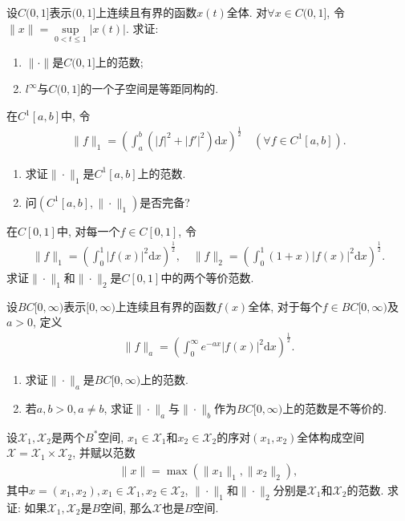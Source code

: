 \documentclass[../../main.tex]{subfiles}%
\begin{document}
\begin{example}
设$C(0, 1]$表示$(0, 1]$上连续且有界的函数$x(t)$全体. 对$\forall x \in C(0, 1]$, 令$\|x\| = \sup\limits_{0 < t \leqslant 1} |x(t)|$. 求证:
\begin{enumerate}[(1)]
\item $\|\cdot\|$是$C(0, 1]$上的范数;
\item $l^\infty$与$C(0, 1]$的一个子空间是等距同构的.
\end{enumerate}
\end{example}

\begin{example}
在$C^1[a, b]$中, 令
\begin{align*}
\|f\|_1 = \left( \int_{a}^{b} (|f|^2 + |f'|^2) \mathrm{d}x \right)^{\frac{1}{2}} \quad (\forall f \in C^1[a, b]).
\end{align*}
\begin{enumerate}[(1)]
\item 求证$\|\cdot\|_1$是$C^1[a, b]$上的范数.
\item 问$(C^1[a, b], \|\cdot\|_1)$是否完备?
\end{enumerate}
\end{example}

\begin{example}
在$C[0, 1]$中, 对每一个$f \in C[0, 1]$, 令
\begin{align*}
\|f\|_1 = \left( \int_{0}^{1} |f(x)|^2 \mathrm{d}x \right)^{\frac{1}{2}}, \quad 
\|f\|_2 = \left( \int_{0}^{1} (1 + x)|f(x)|^2 \mathrm{d}x \right)^{\frac{1}{2}}.
\end{align*}
求证$\|\cdot\|_1$和$\|\cdot\|_2$是$C[0, 1]$中的两个等价范数.
\end{example}

\begin{example}
设$BC[0, \infty)$表示$[0, \infty)$上连续且有界的函数$f(x)$全体, 对于每个$f \in BC[0, \infty)$及$a > 0$, 定义
\begin{align*}
\|f\|_a = \left( \int_{0}^{\infty} e^{-ax} |f(x)|^2 \mathrm{d}x \right)^{\frac{1}{2}}.
\end{align*}
\begin{enumerate}[(1)]
\item 求证$\|\cdot\|_a$是$BC[0, \infty)$上的范数.
\item 若$a, b > 0, a \neq b$, 求证$\|\cdot\|_a$与$\|\cdot\|_b$作为$BC[0, \infty)$上的范数是不等价的.
\end{enumerate}
\end{example}

\begin{example}
设$\mathscr{X}_1, \mathscr{X}_2$是两个$B^*$空间, $x_1 \in \mathscr{X}_1$和$x_2 \in \mathscr{X}_2$的序对$(x_1, x_2)$全体构成空间$\mathscr{X} = \mathscr{X}_1 \times \mathscr{X}_2$, 并赋以范数
\begin{align*}
\|x\| = \max(\|x_1\|_1, \|x_2\|_2),
\end{align*}
其中$x = (x_1, x_2), x_1 \in \mathscr{X}_1, x_2 \in \mathscr{X}_2$, $\|\cdot\|_1$和$\|\cdot\|_2$分别是$\mathscr{X}_1$和$\mathscr{X}_2$的范数. 求证: 如果$\mathscr{X}_1, \mathscr{X}_2$是$B$空间, 那么$\mathscr{X}$也是$B$空间.
\end{example}
\end{document}
